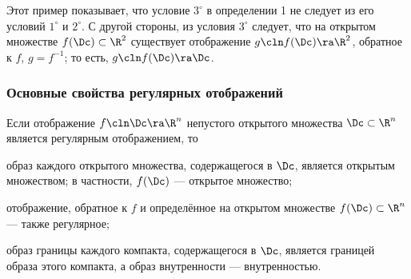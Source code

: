 \documentclass[a4paper]{article}
\begin{document}
Этот пример показывает, что условие $3^{\circ}$ в определении 1 не
следует из его условий $1^{\circ}$ и $2^{\circ}$. С другой стороны,
из условия $3^{\circ}$ следует, что на открытом множестве
$f(\Dc)\subset\R^2$ существует отображение $g\cln f(\Dc)\ra\R^2$,
обратное к $f$, $g=f^{-1}$; то есть, $g\cln f(\Dc)\ra\Dc$.

\subsubsection{Основные свойства регулярных отображений}

\begin{theorem}
\label{thm721} Если отображение $f\cln \Dc\ra\R^n$ непустого
открытого множества $\Dc\subset\R^n$ является регулярным
отображением, то
\begin{points}{-2}
\item образ каждого открытого множества, содержащегося в $\Dc$,
является открытым множеством; в частности, $f(\Dc)$ --- открытое
множество;

\item отображение, обратное к $f$ и определённое на открытом
множестве $f(\Dc)\subset\R^n$ --- также регулярное;

\item образ границы каждого компакта, содержащегося в $\Dc$,
является границей образа этого компакта, а образ внутренности ---
внутренностью.
\end{points}
\end{theorem}
\end{document}
